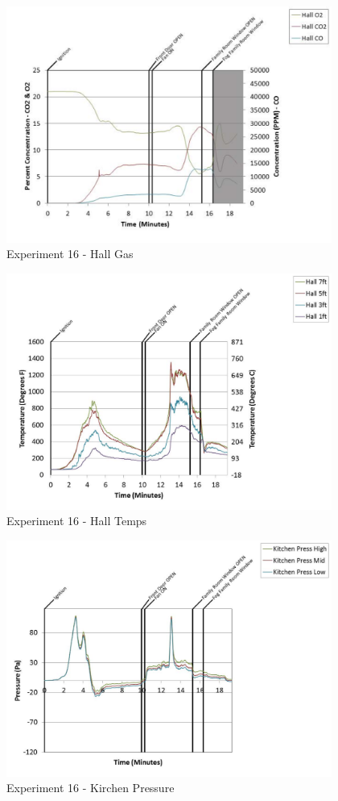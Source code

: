 \documentclass{article}
\begin{document}
\begin{appendices}
	\clearpage

	\begin{figure}[h!]
		\centering
		\includegraphics[height=3.05in]{0_Images/Results_Charts/Exp_16_Charts/HallGas.pdf}
		\caption{Experiment 16 - Hall Gas}
	\end{figure}
 

	\begin{figure}[h!]
		\centering
		\includegraphics[height=3.05in]{0_Images/Results_Charts/Exp_16_Charts/HallTemps.pdf}
		\caption{Experiment 16 - Hall Temps}
	\end{figure}
 
	\clearpage

	\begin{figure}[h!]
		\centering
		\includegraphics[height=3.05in]{0_Images/Results_Charts/Exp_16_Charts/KirchenPressure.pdf}
		\caption{Experiment 16 - Kirchen Pressure}
	\end{figure}
 


\end{appendices}
\end{document}
